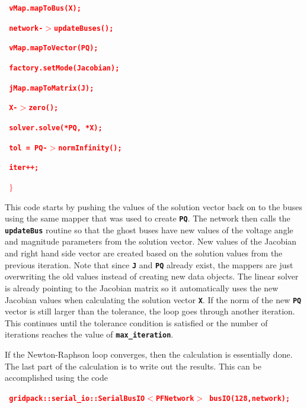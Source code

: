 \documentclass[12pt]{report} %
\begin{document}
\textcolor{red}{\texttt{\textbf{    vMap.mapToBus(X);}}}

\textcolor{red}{\texttt{\textbf{    network-$\boldsymbol{\mathrm{>}}$updateBuses();}}}

\textcolor{red}{\texttt{\textbf{}}}

\textcolor{red}{\texttt{\textbf{    vMap.mapToVector(PQ);}}}

\textcolor{red}{\texttt{\textbf{    factory.setMode(Jacobian);}}}

\textcolor{red}{\texttt{\textbf{    jMap.mapToMatrix(J);}}}

\textcolor{red}{\texttt{\textbf{}}}

\textcolor{red}{\texttt{\textbf{    X-$\boldsymbol{\mathrm{>}}$zero();}}}

\textcolor{red}{\texttt{\textbf{    solver.solve(*PQ, *X);}}}

\textcolor{red}{\texttt{\textbf{    tol = PQ-$\boldsymbol{\mathrm{>}}$normInfinity();}}}

\textcolor{red}{\texttt{\textbf{    iter++;}}}

\textcolor{red}{\texttt{\textbf{  $\boldsymbol{\mathrm{\}}}$}}}

This code starts by pushing the values of the solution vector back on to the buses using the same mapper that was used to create \texttt{\textbf{PQ}}. The network then calls the \texttt{\textbf{updateBus}} routine so that the ghost buses have new values of the voltage angle and magnitude parameters from the solution vector. New values of the Jacobian and right hand side vector are created based on the solution values from the previous iteration. Note that since \texttt{\textbf{J}} and \texttt{\textbf{PQ}} already exist, the mappers are just overwriting the old values instead of creating new data objects. The linear solver is already pointing to the Jacobian matrix so it automatically uses the new Jacobian values when calculating the solution vector \texttt{\textbf{X}}. If the norm of the new \texttt{\textbf{PQ}} vector is still larger than the tolerance, the loop goes through another iteration. This continues until the tolerance condition is satisfied or the number of iterations reaches the value of \texttt{\textbf{max\_iteration}}.

If the Newton-Raphson loop converges, then the calculation is essentially done. The last part of the calculation is to write out the results. This can be accomplished using the code

\textcolor{red}{\texttt{\textbf{  gridpack::serial\_io::SerialBusIO$\boldsymbol{\mathrm{<}}$PFNetwork$\boldsymbol{\mathrm{>}}$ busIO(128,network);}}}
\end{document}
